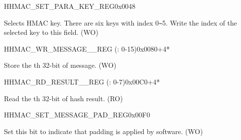 \begin{register}{H}{HMAC\_SET\_PARA\_KEY\_REG}{0x0048}\label{regdesc:HMACSETPARAKEYREG}
%
%
\regnewline%
\begin{regdesc}\begin{reglist}
\label{fielddesc:HMACKEYSET}\item [HMAC\_KEY\_SET] Selects HMAC key. There are six keys with index 0\verb+~+5. Write the index of the selected key to this field. (WO)
\end{reglist}\end{regdesc}
\end{register}


\begin{register}{H}{HMAC\_WR\_MESSAGE\_\_REG (: 0-15)}{0x0080+4*}\label{regdesc:HMACWRMESSAGENREG}
%
\regnewline%
\begin{regdesc}\begin{reglist}
\label{fielddesc:HMACWDATAN}\item [HMAC\_WDATA\_\regindex{n}] Store the th 32-bit of message. (WO)
\end{reglist}\end{regdesc}
\end{register}


\begin{register}{H}{HMAC\_RD\_RESULT\_\_REG (: 0-7)}{0x00C0+4*}\label{regdesc:HMACRDRESULTNREG}
%
\regnewline%
\begin{regdesc}\begin{reglist}
\label{fielddesc:HMACRDATAN}\item [HMAC\_RDATA\_\regindex{n}] Read the th 32-bit of hash result. (RO)
\end{reglist}\end{regdesc}
\end{register}


\begin{register}{H}{HMAC\_SET\_MESSAGE\_PAD\_REG}{0x00F0}\label{regdesc:HMACSETMESSAGEPADREG}
%
%
\regnewline%
\begin{regdesc}\begin{reglist}
\label{fielddesc:HMACSETTEXTPAD}\item [HMAC\_SET\_TEXT\_PAD] Set this bit to indicate that padding is applied by software. (WO)
\end{reglist}\end{regdesc}
\end{register}


